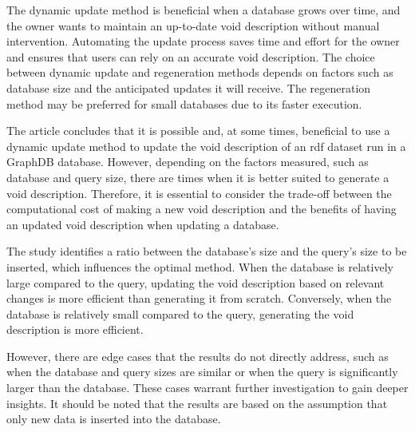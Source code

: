 \documentclass[a4paper]{article}
\begin{document}
The dynamic update method is beneficial when a database grows over time, and the owner wants to maintain an up-to-date \gls{void} description without manual intervention. Automating the update process saves time and effort for the owner and ensures that users can rely on an accurate \gls{void} description. The choice between dynamic update and regeneration methods depends on factors such as database size and the anticipated updates it will receive. The regeneration method may be preferred for small databases due to its faster execution.

The article concludes that it is possible and, at some times, beneficial to use a dynamic update method to update the \gls{void} description of an \gls{rdf} dataset run in a GraphDB database. However, depending on the factors measured, such as database and query size, there are times when it is better suited to generate a \gls{void} description. Therefore, it is essential to consider the trade-off between the computational cost of making a new \gls{void} description and the benefits of having an updated \gls{void} description when updating a database.

The study identifies a ratio between the database's size and the query's size to be inserted, which influences the optimal method. When the database is relatively large compared to the query, updating the \gls{void} description based on relevant changes is more efficient than generating it from scratch. Conversely, when the database is relatively small compared to the query, generating the \gls{void} description is more efficient.

However, there are edge cases that the results do not directly address, such as when the database and query sizes are similar or when the query is significantly larger than the database. These cases warrant further investigation to gain deeper insights. It should be noted that the results are based on the assumption that only new data is inserted into the database.
\end{document}
